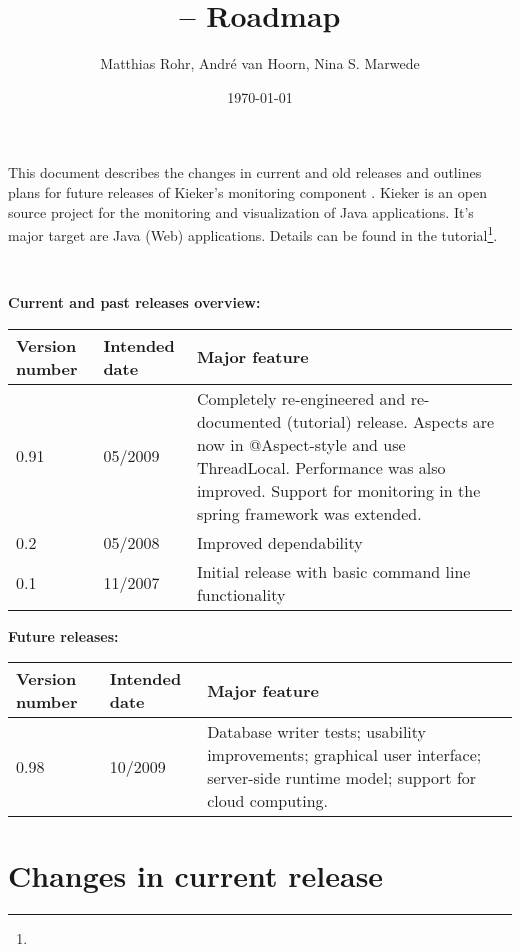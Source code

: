 \documentclass{scrartcl}
\title{\kieker -- Roadmap}
\date{\today \\ \kiekerurl{roadmap.pdf}}
\author{Matthias Rohr, Andr\'{e} van Hoorn, Nina S. Marwede}
\begin{document}
\maketitle
\noindent
This document describes the changes in current and old releases and outlines plans for future releases of Kieker's monitoring component \tpmon{}. Kieker is an open source project
for the monitoring and visualization of Java applications. It's major target are Java (Web) applications. Details can be found in the tutorial\footnote{\kiekertutorialurl}.

\

\noindent \large{\textbf{Current and past releases overview:}}
\begin{center}%
 \begin{tabular}{|l|l|p{8cm}|} \hline
\textbf{Version number} & \textbf{Intended date} & \textbf{Major feature} \\ \hline
0.91 & 05/2009 & Completely re-engineered and re-documented (tutorial) release. Aspects are now in @Aspect-style and use ThreadLocal. Performance was also improved. Support for monitoring in the spring framework was extended.\\ \hline
0.2 & 05/2008 & Improved dependability \\ \hline
0.1 & 11/2007 & Initial release with basic command line functionality \\ \hline
\end{tabular}
\end{center}

\noindent \large{\textbf{Future releases:}}
\begin{center}%
 \begin{tabular}{|l|l|p{8cm}|} \hline
\textbf{Version number} & \textbf{Intended date} & \textbf{Major feature} \\ \hline
0.98 & 10/2009 & Database writer tests; usability improvements; graphical user interface; server-side runtime model; support for cloud computing.\\ \hline
\end{tabular}
\end{center}


\section{Changes in current release}
\end{document}
